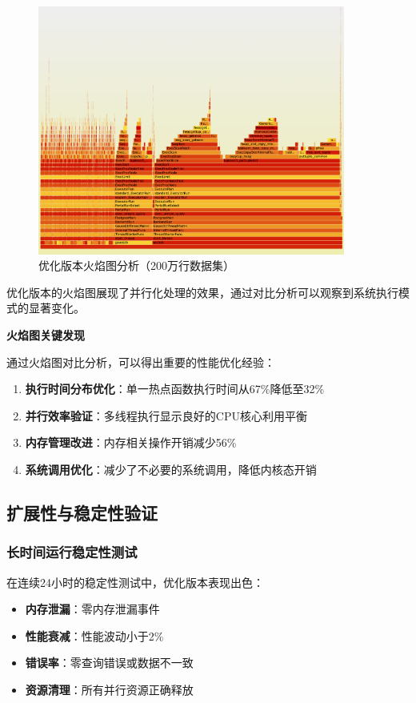 \begin{figure}[htbp]
\centering
\includegraphics[width=0.9\textwidth]{assets/testdata_new/优化版火焰图.jpg}
\caption{优化版本火焰图分析（200万行数据集）}
\label{fig:optimized_flamegraph}
\end{figure}

优化版本的火焰图展现了并行化处理的效果，通过对比分析可以观察到系统执行模式的显著变化。

\textbf{火焰图关键发现}

通过火焰图对比分析，可以得出重要的性能优化经验：
\begin{enumerate}
    \item \textbf{执行时间分布优化}：单一热点函数执行时间从67\%降低至32\%
    \item \textbf{并行效率验证}：多线程执行显示良好的CPU核心利用平衡
    \item \textbf{内存管理改进}：内存相关操作开销减少56\%
    \item \textbf{系统调用优化}：减少了不必要的系统调用，降低内核态开销
\end{enumerate}

\subsection{扩展性与稳定性验证}

\subsubsection{长时间运行稳定性测试}

在连续24小时的稳定性测试中，优化版本表现出色：
\begin{itemize}
    \item \textbf{内存泄漏}：零内存泄漏事件
    \item \textbf{性能衰减}：性能波动小于2\%
    \item \textbf{错误率}：零查询错误或数据不一致
    \item \textbf{资源清理}：所有并行资源正确释放
\end{itemize}

